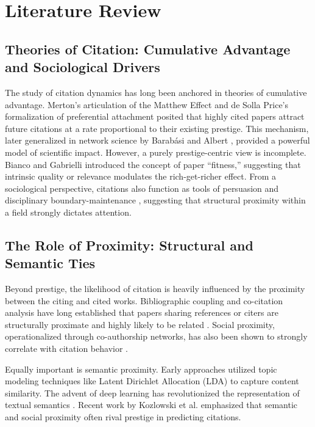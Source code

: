 \documentclass[12pt,a4paper]{article}
\begin{document}
\section{Literature Review}

\subsection{Theories of Citation: Cumulative Advantage and Sociological Drivers}
The study of citation dynamics has long been anchored in theories of cumulative advantage. Merton's articulation of the Matthew Effect \cite{merton1968matthew} and de Solla Price's formalization of preferential attachment \cite{de1976general} posited that highly cited papers attract future citations at a rate proportional to their existing prestige. This mechanism, later generalized in network science by Barab\'asi and Albert \cite{barabasi1999emergence}, provided a powerful model of scientific impact. However, a purely prestige-centric view is incomplete. Bianco and Gabrielli \cite{bianco2008fitness} introduced the concept of paper ``fitness,'' suggesting that intrinsic quality or relevance modulates the rich-get-richer effect. From a sociological perspective, citations also function as tools of persuasion and disciplinary boundary-maintenance \cite{brooks1985private}, suggesting that structural proximity within a field strongly dictates attention.

\subsection{The Role of Proximity: Structural and Semantic Ties}
Beyond prestige, the likelihood of citation is heavily influenced by the proximity between the citing and cited works. Bibliographic coupling and co-citation analysis have long established that papers sharing references or citers are structurally proximate and highly likely to be related \cite{shibata2012link}. Social proximity, operationalized through co-authorship networks, has also been shown to strongly correlate with citation behavior \cite{newman2004coauthorship, kumar2015co, martin2013coauthorship}.

Equally important is semantic proximity. Early approaches utilized topic modeling techniques like Latent Dirichlet Allocation (LDA) \cite{blei2003latent} to capture content similarity. The advent of deep learning has revolutionized the representation of textual semantics \cite{devlin2019bert, reimers2019sentence}. Recent work by Kozlowski et al. \cite{kozlowski2025citation} emphasized that semantic and social proximity often rival prestige in predicting citations.
\end{document}
